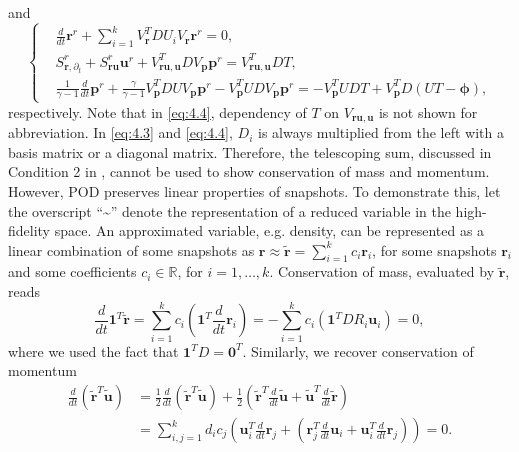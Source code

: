 and
\begin{equation} \label{eq:4.4}
\left\{
\begin{aligned}
	& \frac{d}{dt} \mathbf r^r + \sum_{i=1}^k V^T_{\mathbf r}DU_iV_{\mathbf r}\mathbf r^r = 0, \\
	& S^r_{\mathbf r ,\partial_t} + S^r _{\mathbf r \mathbf u} \mathbf u^r + V_{\mathbf r \mathbf u, \mathbf u}^T D V_{\mathbf p} \mathbf p^r = V_{\mathbf r \mathbf u, \mathbf u}^T D T, \\
	&\frac{1}{\gamma -1} \frac{d}{dt} \mathbf p^r + \frac{\gamma}{\gamma -1} V_{\mathbf p}^T D U V_{\mathbf p} \mathbf p^r - V_{\mathbf p}^T UD V_{\mathbf p} \mathbf p^r = - V_{\mathbf p}^T UDT + V_{\mathbf p}^T D(UT - \mathbf \phi),
\end{aligned}
\right.
\end{equation}
respectively. Note that in \eqref{eq:4.4}, dependency of $T$ on $V_{\mathbf r \mathbf u , \mathbf u}$ is not shown for abbreviation. In \eqref{eq:4.3} and \eqref{eq:4.4}, $D_i$ is always multiplied from the left with a basis matrix or a diagonal matrix. Therefore, the telescoping sum, discussed in Condition 2 in , cannot be used to show conservation of mass and momentum. However, POD preserves linear properties of snapshots. To demonstrate this, let the overscript ``\textasciitilde'' denote the representation of a reduced variable in the high-fidelity space. An approximated variable, e.g. density, can be represented as a linear combination of some snapshots as $\mathbf r \approx \tilde{\mathbf r} = \sum_{i=1}^k c_i \mathbf r_i$, for some snapshots $\mathbf r_i$ and some coefficients $c_i \in \mathbb R$, for $i=1,\dots,k$. Conservation of mass, evaluated by $\tilde{\mathbf r}$, reads
\begin{equation} \label{eq:4.5}
	\frac{d}{dt} \mathbf 1^T \tilde {\mathbf r} = \sum_{i=1}^k c_i  \left( \mathbf 1^T \frac{d}{dt} \mathbf r_i \right) = - \sum_{i=1}^k c_i  \left( \mathbf 1^T DR_i\mathbf u_i \right) = 0,
\end{equation}
where we used the fact that $\mathbf 1^T D = \mathbf 0^T$. Similarly, we recover conservation of momentum
\begin{equation} \label{eq:4.6}
\begin{aligned}
	\frac{d}{dt}(\tilde {\mathbf r}^T \tilde{\mathbf u}) &= \frac{1}{2} \frac{d}{dt}(\tilde{\mathbf r}^T \tilde{\mathbf u}) + \frac{1}{2} \left( \tilde{ \mathbf r }^T \frac d{dt} \tilde{ \mathbf u } + \tilde {\mathbf u}^T \frac{d}{dt} \tilde {\mathbf r} \right)\\
	&= \sum_{i,j=1}^k d_i c_j \left( \mathbf u_i^T \frac{d}{dt} \mathbf r_j + \left( \mathbf r_j^T \frac d{dt} \mathbf u_i +\mathbf u_i^T \frac{d}{dt} \mathbf r_j \right)\right) = 0.\\
\end{aligned}
\end{equation}
